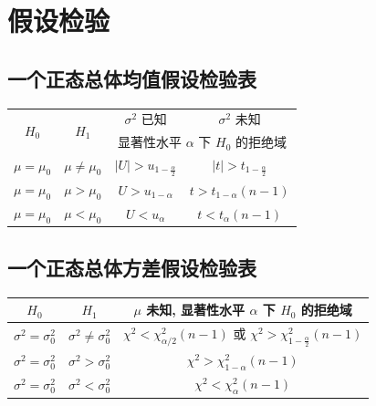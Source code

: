\documentclass[UTF8]{ctexart}
\begin{document}
\section{假设检验}
\subsection{一个正态总体均值假设检验表}
\renewcommand{\arraystretch}{1.5}
\begin{table}[H]
\centering
\makegapedcells
\begin{tabular}{c|c|c|c}
    \hline
    \multirow{2}{*}{$ H_0 $} & \multirow{2}{*}{$ H_1 $} & $ \sigma^2 $ 已知 & $ \sigma^2 $ 未知 \\ \cline{3-4} 
    &                   & \multicolumn{2}{c}{显著性水平 $ \alpha $ 下 $ H_0 $ 的拒绝域} \\ \hline
    $ \mu = \mu_0 $ & $ \mu \neq \mu_0 $ & $ |U| > u_{1 - \frac{\alpha}{2}} $ & $ |t| > t_{1 - \frac{\alpha}{2}} $ \\ \hline
    $ \mu = \mu_0 $ & $ \mu > \mu_0 $ & $ U > u_{1 - \alpha} $ & $ t > t_{1 - \alpha}(n - 1) $ \\ \hline
    $ \mu = \mu_0 $ & $ \mu < \mu_0 $ & $ U < u_{\alpha} $ & $ t < t_{\alpha}(n - 1) $ \\ \hline
    \end{tabular}
\end{table}



\subsection{一个正态总体方差假设检验表}
\renewcommand{\arraystretch}{1.5}
\begin{table}[H]
\centering
\makegapedcells
\begin{tabular}{c|c|c}
    \hline
    $ H_0 $ & $ H_1 $ & $ \mu $ 未知, 显著性水平 $ \alpha $ 下 $ H_0 $ 的拒绝域 \\

    \hline
    $ \sigma^2 = \sigma_0^2 $ & $ \sigma^2 \neq \sigma_0^2 $ & $ \chi^2 < \chi_{\alpha / 2}^2(n - 1) $ 或 $ \chi^2 > \chi_{1 - \frac{\alpha}{2}}^2 (n - 1) $ \\

    \hline
    $ \sigma^2 = \sigma_0^2 $ & $ \sigma^2 > \sigma_0^2 $ & $ \chi^2 > \chi_{1 - \alpha}^2 (n - 1) $ \\

    \hline
    $ \sigma^2 = \sigma_0^2 $ & $ \sigma^2 < \sigma_0^2 $ & $ \chi^2 <  \chi_{\alpha}^2 (n - 1) $ \\

    \hline
    \end{tabular}
\end{table}
\end{document}
